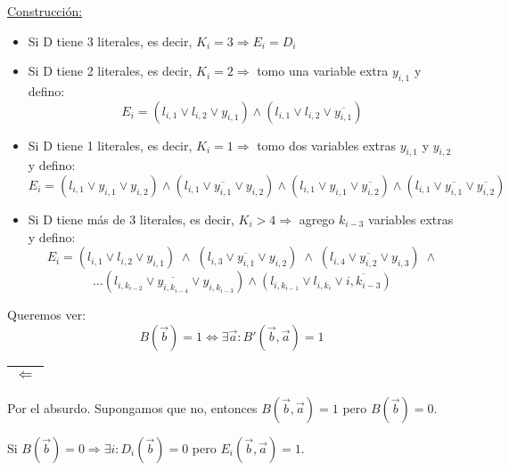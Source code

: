 \documentclass[12pt,a4paper]{report}
\begin{document}
		\underline{Construcción:}
		\begin{itemize}
			\item Si D tiene 3 literales, es decir, $K_{i} = 3 \Rightarrow E_{i} = D_{i}$
			\item Si D tiene 2 literales, es decir, $K_{i} = 2 \Rightarrow$ tomo una variable extra $y_{i, 1}$ y defino:
				\[ E_{i} = (l_{i, 1} \vee l_{i, 2} \vee y_{i, 1}) \wedge (l_{i, 1} \vee l_{i, 2} \vee \overline{y_{i, 1}}) \]
			\item Si D tiene 1 literales, es decir, $K_{i} = 1 \Rightarrow$ tomo dos variables extras $y_{i, 1}$ y $y_{i, 2}$ y defino:
				\[ E_{i} = (l_{i, 1} \vee y_{i, 1} \vee y_{i, 2}) \wedge (l_{i, 1} \vee \overline{y_{i, 1}} \vee y_{i, 2}) \wedge (l_{i, 1} \vee y_{i, 1} \vee \overline{y_{i, 2}}) \wedge (l_{i, 1} \vee \overline{y_{i, 1}} \vee \overline{y_{i, 2}}) \]
			\item Si D tiene más de 3 literales, es decir, $K_{i} > 4 \Rightarrow$ agrego $k_{i-3}$ variables extras y defino:
				\[ E_{i} = (l_{i, 1} \vee l_{i, 2} \vee y_{i, 1}) \; \wedge \; (l_{i, 3} \vee \overline{y_{i, 1}} \vee y_{i, 2}) \; \wedge \; (l_{i, 4} \vee \overline{y_{i, 2}} \vee y_{i, 3}) \; \wedge \]
				\[ \dotsc (l_{i, k_{i-2}} \vee \overline{y_{i, k_{i-4}}} \vee y_{i, k_{i-3}}) \wedge (l_{i, k_{i-1}} \vee l_{i, k_{i}} \vee \overline{i, k_{i-3}}) \]
		\end{itemize}
		\par Queremos ver:
		\[ B(\overrightarrow{b}) = 1 \Leftrightarrow \exists \overrightarrow{a} : B'(\overrightarrow{b}, \overrightarrow{a}) = 1 \]

		\vspace{5mm}
		\begin{tabular}{|c|} \hline $\Leftarrow$ \\\hline \end{tabular}
			\par Por el absurdo. Supongamos que no, entonces $B(\overrightarrow{b}, \overrightarrow{a}) = 1$ pero $B(\overrightarrow{b}) = 0$.
			\par Si $B(\overrightarrow{b}) = 0 \Rightarrow \exists i : D_{i}(\overrightarrow{b}) = 0$ pero $E_{i}(\overrightarrow{b}, \overrightarrow{a}) = 1$.
\end{document}
